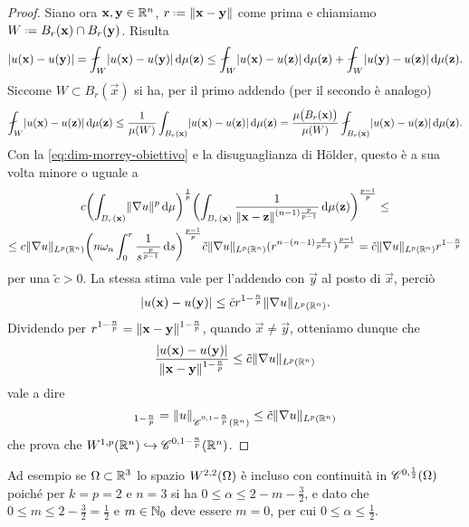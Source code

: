 \begin{proof}
    Siano ora $\vec x,\vec y\in\R^n$, $r\defeq\norm{\vec x-\vec y}$ come prima e chiamiamo $W\defeq B_r(\vec x)\cap B_r(\vec y)$.
    Risulta
    \begin{equation}
        \abs{u(\vec x)-u(\vec y)}=
        \avint_W \abs{u(\vec x)-u(\vec y)}\,\dd\mu(\vec z)\le
        \avint_W \abs{u(\vec x)-u(\vec z)}\,\dd\mu(\vec z)+\avint_W \abs{u(\vec y)-u(\vec z)}\,\dd\mu(\vec z).
    \end{equation}
    Siccome $W\subset B_r(\vec x)$ si ha, per il primo addendo (per il secondo è analogo)
    \begin{equation}
        \avint_W \abs{u(\vec x)-u(\vec z)}\,\dd\mu(\vec z)\le
        \frac1{\mu(W)}\int_{B_r(\vec x)}\abs{u(\vec x)-u(\vec z)}\,\dd\mu(\vec z)=
        \frac{\mu\bigl(B_r(\vec x)\bigr)}{\mu(W)}\avint_{B_r(\vec x)}\abs{u(\vec x)-u(\vec z)}\,\dd\mu(\vec z).
    \end{equation}
    Con la \eqref{eq:dim-morrey-obiettivo} e la disuguaglianza di Hölder, questo è a sua volta minore o uguale a
    \begin{multline}
        c\biggl(\int_{B_r(\vec x)}\norm{\grad u}^p\,\dd\mu\biggr)^\frac1{p}\biggl(\int_{B_r(\vec x)}\frac1{\norm{\vec x-\vec z}^{(n-1)\frac{p}{p-1}}}\,\dd\mu(\vec z)\biggr)^\frac{p-1}{p}\le\\ \le
        c\norm{\grad u}_{\leb[p]{\R^n}}\biggl(n\omega_n\int_0^r \frac1{s^\frac{p}{p-1}}\,\dd s\biggr)^\frac{p-1}{p}
        \tilde{c}\norm{\grad u}_{\leb[p]{\R^n}}(r^{n-(n-1)\frac{p}{p-1}})^\frac{p-1}{p}=
        \tilde{c}\norm{\grad u}_{\leb[p]{\R^n}}r^{1-\frac{n}{p}}
    \end{multline}
    per una $\tilde{c}>0$.
    La stessa stima vale per l'addendo con $\vec y$ al posto di $\vec x$, perciò
    \begin{equation}
        \abs{u(\vec x)-u(\vec y)}\le\tilde{c}r^{1-\frac{n}{p}}\norm{\grad u}_{\leb[p]{\R^n}}.
    \end{equation}
    Dividendo per $r^{1-\frac{n}{p}}=\norm{\vec x-\vec y}^{1-\frac{n}{p}}$, quando $\vec x\ne\vec y$, otteniamo dunque che
    \begin{equation}
        \frac{\abs{u(\vec x)-u(\vec y)}}{\norm{\vec x-\vec y}^{1-\frac{n}{p}}}\le\tilde{c}\norm{\grad u}_{\leb[p]{\R^n}}
    \end{equation}
    vale a dire
    \begin{equation}
        [u]_{1-\frac{n}{p}}=\norm{u}_{\cont[0,1-\frac{n}{p}]{\R^n}}\le\tilde{c}\norm{\grad u}_{\leb[p]{\R^n}}
    \end{equation}
    che prova che $\sobW[1,p]{\R^n}\emb\cont[0,1-\frac{n}{p}]{\R^n}$.
\end{proof}
Ad esempio se $\Omega\subset\R^3$ lo spazio $\sobW[2,2]{\Omega}$ è incluso con continuità in $\cont[0,\frac12]{\Omega}$ poich\'e per $k=p=2$ e $n=3$ si ha $0\le\alpha\le 2-m-\frac32$, e dato che $0\le m\le 2-\frac32=\frac12$ e $m\in\N_0$ deve essere $m=0$, per cui $0\le\alpha\le\frac12$.

